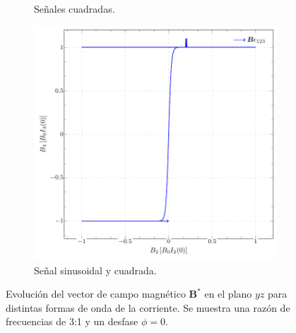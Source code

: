 \begin{figure}[htbp!]
\begin{subfigure}{0.32\linewidth}
		\caption{Señales cuadradas.}
		\label{fig:b_sqr_sqr}
	\end{subfigure}
	\hfill
	\begin{subfigure}{0.32\linewidth}
		\includegraphics[width=\linewidth]{../Figures/Uniform-Field/B-sin-square.pdf}
		\caption{Señal sinusoidal y cuadrada.}
		\label{fig:b_sin_sqr}
	\end{subfigure}
	\caption{Evolución del vector de campo magnético $\boldsymbol{B}^*$ en
		el plano $yz$ para distintas formas de onda de la corriente. Se
	muestra una razón de frecuencias de 3:1 y un desfase $\phi=0$.}
	\label{fig:B_fields}
\end{figure}
